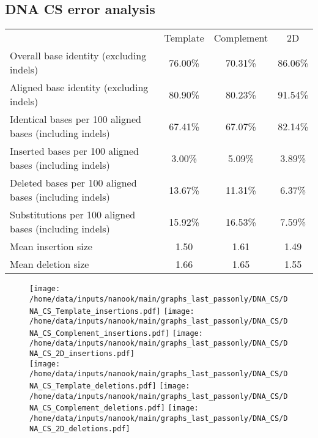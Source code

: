\documentclass[a4paper,11pt,oneside]{article}
\begin{document}
\subsection*{DNA CS error analysis}
\vspace{-3mm}
\begin{table}[H]
{\footnotesize
\fontsize{9pt}{11pt}\selectfont
\begin{tabular}{l c c c}
 & Template & Complement & 2D \\
Overall base identity (excluding indels) & 76.00\% & 70.31\% & 86.06\% \\
Aligned base identity (excluding indels) & 80.90\% & 80.23\% & 91.54\% \\
Identical bases per 100 aligned bases (including indels) & 67.41\% & 67.07\% & 82.14\% \\
Inserted bases per 100 aligned bases (including indels) & 3.00\% & 5.09\% & 3.89\% \\
Deleted bases per 100 aligned bases (including indels) & 13.67\% & 11.31\% & 6.37\% \\
Substitutions per 100 aligned bases (including indels) & 15.92\% & 16.53\% & 7.59\% \\
Mean insertion size & 1.50 & 1.61 & 1.49 \\
Mean deletion size & 1.66 & 1.65 & 1.55 \\
\end{tabular}
}
\end{table}
\vspace{-5mm}
\begin{figure}[H]
\centering
\texttt{[image: /home/data/inputs/nanook/main/graphs\_last\_passonly/DNA\_CS/DNA\_CS\_Template\_insertions.pdf]}
\texttt{[image: /home/data/inputs/nanook/main/graphs\_last\_passonly/DNA\_CS/DNA\_CS\_Complement\_insertions.pdf]}
\texttt{[image: /home/data/inputs/nanook/main/graphs\_last\_passonly/DNA\_CS/DNA\_CS\_2D\_insertions.pdf]} \\
\texttt{[image: /home/data/inputs/nanook/main/graphs\_last\_passonly/DNA\_CS/DNA\_CS\_Template\_deletions.pdf]}
\texttt{[image: /home/data/inputs/nanook/main/graphs\_last\_passonly/DNA\_CS/DNA\_CS\_Complement\_deletions.pdf]}
\texttt{[image: /home/data/inputs/nanook/main/graphs\_last\_passonly/DNA\_CS/DNA\_CS\_2D\_deletions.pdf]}
\end{figure}
\end{document}
